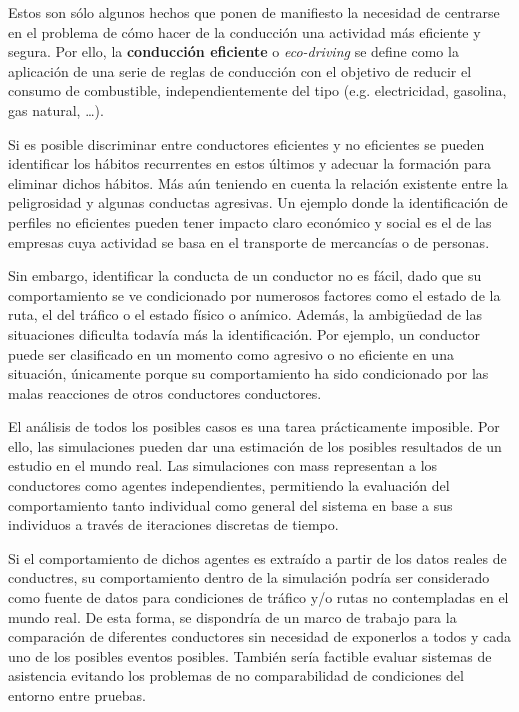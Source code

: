 Estos son sólo algunos hechos que ponen de manifiesto la necesidad de centrarse en el problema de cómo hacer de la conducción una actividad más eficiente y segura. Por ello, la \textbf{conducción eficiente} o \textit{eco-driving} se define como la aplicación de una serie de reglas de conducción con el objetivo de reducir el consumo de combustible, independientemente del tipo (e.g. electricidad, gasolina, gas natural, \ldots).

Si es posible discriminar entre conductores eficientes y no eficientes se pueden identificar los hábitos recurrentes en estos últimos y adecuar la formación para eliminar dichos hábitos. Más aún teniendo en cuenta la relación existente entre la peligrosidad y algunas conductas agresivas. Un ejemplo donde la identificación de perfiles no eficientes pueden tener impacto claro económico y social es el de las empresas cuya actividad se basa en el transporte de mercancías o de personas.

Sin embargo, identificar la conducta de un conductor no es fácil, dado que su comportamiento se ve condicionado por numerosos factores como el estado de la ruta, el del tráfico o el estado físico o anímico. Además, la ambigüedad de las situaciones dificulta todavía más la identificación. Por ejemplo, un conductor puede ser clasificado en un momento como agresivo o no eficiente en una situación, únicamente porque su comportamiento ha sido condicionado por las malas reacciones de otros conductores conductores.

El análisis de todos los posibles casos es una tarea prácticamente imposible. Por ello, las simulaciones pueden dar una estimación de los posibles resultados de un estudio en el mundo real. Las simulaciones con \glspl{mas} representan a los conductores como agentes independientes, permitiendo la evaluación del comportamiento tanto individual como general del sistema en base a sus individuos a través de iteraciones discretas de tiempo.

Si el comportamiento de dichos agentes es extraído a partir de los datos reales de conductres, su comportamiento dentro de la simulación podría ser considerado como fuente de datos para condiciones de tráfico y/o rutas no contempladas en el mundo real. De esta forma, se dispondría de un marco de trabajo para la comparación de diferentes conductores sin necesidad de exponerlos a todos y cada uno de los posibles eventos posibles. También sería factible evaluar sistemas de asistencia evitando los problemas de no comparabilidad de condiciones del entorno entre pruebas.


